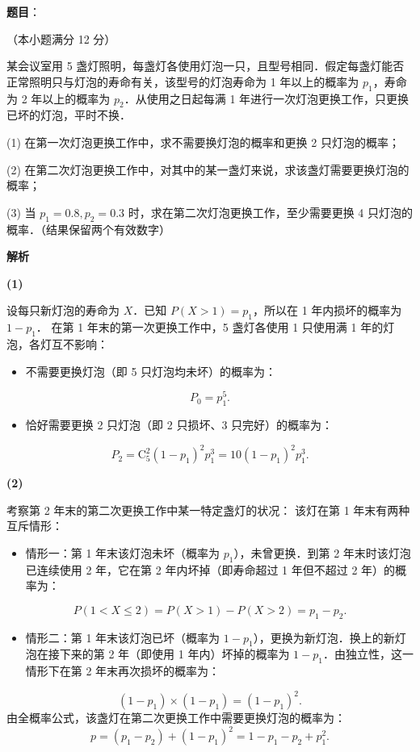 \begin{answer}

\textbf{题目}：

（本小题满分 12 分）

某会议室用 5 盏灯照明，每盏灯各使用灯泡一只，且型号相同．假定每盏灯能否正常照明只与灯泡的寿命有关，该型号的灯泡寿命为 1 年以上的概率为 $p_1$，寿命为 2 年以上的概率为 $p_2$．从使用之日起每满 1 年进行一次灯泡更换工作，只更换已坏的灯泡，平时不换．

(1) 在第一次灯泡更换工作中，求不需要换灯泡的概率和更换 2 只灯泡的概率；

(2) 在第二次灯泡更换工作中，对其中的某一盏灯来说，求该盏灯需要更换灯泡的概率；

(3) 当 $p_1 = 0.8, p_2 = 0.3$ 时，求在第二次灯泡更换工作，至少需要更换 4 只灯泡的概率．（结果保留两个有效数字）

\textbf{解析}

\textbf{(1)}

设每只新灯泡的寿命为 $X$．已知 $P(X > 1) = p_1$，所以在 1 年内损坏的概率为 $1 - p_1$．
在第 1 年末的第一次更换工作中，5 盏灯各使用 1 只使用满 1 年的灯泡，各灯互不影响：
\begin{itemize}
\item 不需要更换灯泡（即 5 只灯泡均未坏）的概率为：
\end{itemize}
\nopagebreak[4]
\[
P_0 = p_1^5.
\]
\begin{itemize}
\item 恰好需要更换 2 只灯泡（即 2 只损坏、3 只完好）的概率为：
\end{itemize}
\nopagebreak[4]
\[
P_2 = \mathrm{C}_5^2 (1 - p_1)^2 p_1^3 = 10(1 - p_1)^2 p_1^3.
\]

\textbf{(2)}

考察第 2 年末的第二次更换工作中某一特定盏灯的状况：
该灯在第 1 年末有两种互斥情形：
\begin{itemize}
\item 情形一：第 1 年末该灯泡未坏（概率为 $p_1$），未曾更换．到第 2 年末时该灯泡已连续使用 2 年，它在第 2 年内坏掉（即寿命超过 1 年但不超过 2 年）的概率为：
\end{itemize}
\nopagebreak[4]
\[
P(1 < X \leqslant 2) = P(X > 1) - P(X > 2) = p_1 - p_2.
\]
\begin{itemize}
\item 情形二：第 1 年末该灯泡已坏（概率为 $1 - p_1$），更换为新灯泡．换上的新灯泡在接下来的第 2 年（即使用 1 年内）坏掉的概率为 $1 - p_1$．由独立性，这一情形下在第 2 年末再次损坏的概率为：
\end{itemize}
\nopagebreak[4]
\[
(1 - p_1) \times (1 - p_1) = (1 - p_1)^2.
\]
由全概率公式，该盏灯在第二次更换工作中需要更换灯泡的概率为：
\nopagebreak[4]
\[
p = (p_1 - p_2) + (1 - p_1)^2 = 1 - p_1 - p_2 + p_1^2.
\]


\end{answer}
